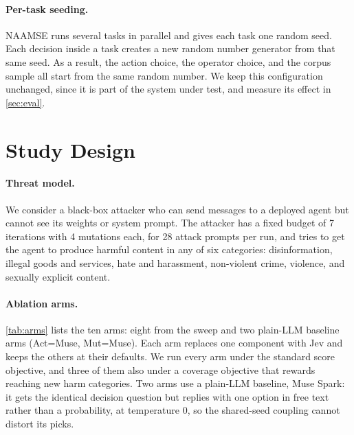 \documentclass{article}
\newcommand{\para}[1]{\paragraph{#1}}
\begin{document}
\para{Per-task seeding.}
NAAMSE runs several tasks in parallel and gives each task one random seed.
Each decision inside a task creates a new random number generator from that same seed.
As a result, the action choice, the operator choice, and the corpus sample all start from the same random number.
We keep this configuration unchanged, since it is part of the system under test, and measure its effect in \autoref{sec:eval}.

\section{Study Design}
\label{sec:design}

\para{Threat model.}
We consider a black-box attacker who can send messages to a deployed agent but cannot see its weights or system prompt.
The attacker has a fixed budget of 7 iterations with 4 mutations each, for 28 attack prompts per run, and tries to get the agent to produce harmful content in any of six categories: disinformation, illegal goods and services, hate and harassment, non-violent crime, violence, and sexually explicit content.

\para{Ablation arms.}
\autoref{tab:arms} lists the ten arms: eight from the sweep and two plain-LLM baseline arms (Act=Muse, Mut=Muse).
Each arm replaces one component with Jev and keeps the others at their defaults.
We run every arm under the standard score objective, and three of them also under a coverage objective that rewards reaching new harm categories.
Two arms use a plain-LLM baseline, Muse Spark: it gets the identical decision question but replies with one option in free text rather than a probability, at temperature 0, so the shared-seed coupling cannot distort its picks.
\end{document}
